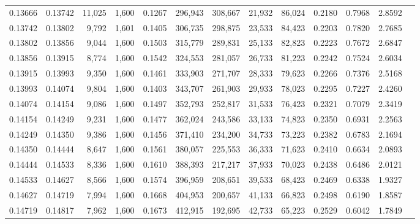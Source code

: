 \begin{tabular}{rrrrrrrrrrrrr}
0.13666 & 0.13742 & 11,025 & 1,600 &                                     0.1267 & 296,943 & 308,667 &  21,932 &  86,024 & 0.2180 & 0.7968 & 2.8592 \\
0.13742 & 0.13802 &  9,792 & 1,601 &                                     0.1405 & 306,735 & 298,875 &  23,533 &  84,423 & 0.2203 & 0.7820 & 2.7685 \\
0.13802 & 0.13856 &  9,044 & 1,600 &                                     0.1503 & 315,779 & 289,831 &  25,133 &  82,823 & 0.2223 & 0.7672 & 2.6847 \\
0.13856 & 0.13915 &  8,774 & 1,600 &                                     0.1542 & 324,553 & 281,057 &  26,733 &  81,223 & 0.2242 & 0.7524 & 2.6034 \\
0.13915 & 0.13993 &  9,350 & 1,600 &                                     0.1461 & 333,903 & 271,707 &  28,333 &  79,623 & 0.2266 & 0.7376 & 2.5168 \\
0.13993 & 0.14074 &  9,804 & 1,600 &                                     0.1403 & 343,707 & 261,903 &  29,933 &  78,023 & 0.2295 & 0.7227 & 2.4260 \\
0.14074 & 0.14154 &  9,086 & 1,600 &                                     0.1497 & 352,793 & 252,817 &  31,533 &  76,423 & 0.2321 & 0.7079 & 2.3419 \\
0.14154 & 0.14249 &  9,231 & 1,600 &                                     0.1477 & 362,024 & 243,586 &  33,133 &  74,823 & 0.2350 & 0.6931 & 2.2563 \\
0.14249 & 0.14350 &  9,386 & 1,600 &                                     0.1456 & 371,410 & 234,200 &  34,733 &  73,223 & 0.2382 & 0.6783 & 2.1694 \\
0.14350 & 0.14444 &  8,647 & 1,600 &                                     0.1561 & 380,057 & 225,553 &  36,333 &  71,623 & 0.2410 & 0.6634 & 2.0893 \\
0.14444 & 0.14533 &  8,336 & 1,600 &                                     0.1610 & 388,393 & 217,217 &  37,933 &  70,023 & 0.2438 & 0.6486 & 2.0121 \\
0.14533 & 0.14627 &  8,566 & 1,600 &                                     0.1574 & 396,959 & 208,651 &  39,533 &  68,423 & 0.2469 & 0.6338 & 1.9327 \\
0.14627 & 0.14719 &  7,994 & 1,600 &                                     0.1668 & 404,953 & 200,657 &  41,133 &  66,823 & 0.2498 & 0.6190 & 1.8587 \\
0.14719 & 0.14817 &  7,962 & 1,600 &                                     0.1673 & 412,915 & 192,695 &  42,733 &  65,223 & 0.2529 & 0.6042 & 1.7849 \\

\end{tabular}
